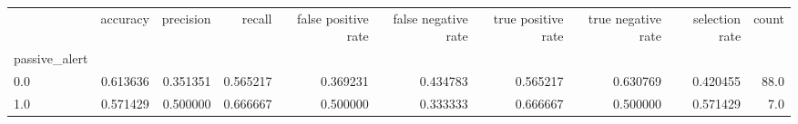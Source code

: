 \begin{tabular}{lrrrrrrrrr}
\toprule
{} &  accuracy &  precision &    recall &  false positive rate &  false negative rate &  true positive rate &  true negative rate &  selection rate &  count \\
passive\_alert &           &            &           &                      &                      &                     &                     &                 &        \\
\midrule
0.0           &  0.613636 &   0.351351 &  0.565217 &             0.369231 &             0.434783 &            0.565217 &            0.630769 &        0.420455 &   88.0 \\
1.0           &  0.571429 &   0.500000 &  0.666667 &             0.500000 &             0.333333 &            0.666667 &            0.500000 &        0.571429 &    7.0 \\
\bottomrule
\end{tabular}
